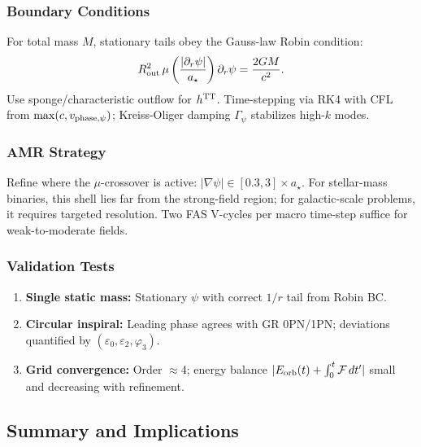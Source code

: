 \subsubsection{Boundary Conditions}

For total mass $M$, stationary tails obey the Gauss-law Robin condition:
\begin{equation}
R_{\rm out}^2\,\mu\left(\frac{|\partial_r\psi|}{a_\star}\right)\partial_r\psi = \frac{2GM}{c^2}.
\end{equation}
Use sponge/characteristic outflow for $h^{\rm TT}$. Time-stepping via RK4 with 
CFL from $\max(c, v_{\rm phase,\psi})$; Kreiss-Oliger damping $\Gamma_\psi$ stabilizes high-$k$ modes.

\subsubsection{AMR Strategy}

Refine where the $\mu$-crossover is active: $|\nabla\psi| \in [0.3, 3] \times a_\star$. 
For stellar-mass binaries, this shell lies far from the strong-field region; for 
galactic-scale problems, it requires targeted resolution. Two FAS V-cycles per 
macro time-step suffice for weak-to-moderate fields.

\subsubsection{Validation Tests}

\begin{enumerate}
\item \textbf{Single static mass:} Stationary $\psi$ with correct $1/r$ tail from Robin BC.
\item \textbf{Circular inspiral:} Leading phase agrees with GR 0PN/1PN; deviations 
      quantified by $(\varepsilon_0, \varepsilon_2, \varphi_3)$.
\item \textbf{Grid convergence:} Order $\approx 4$; energy balance 
      $|E_{\rm orb}(t) + \int_0^t \mathcal{F}\,dt'|$ small and decreasing with refinement.
\end{enumerate}

\subsection{Summary and Implications}\label{sec:gw-summary}

